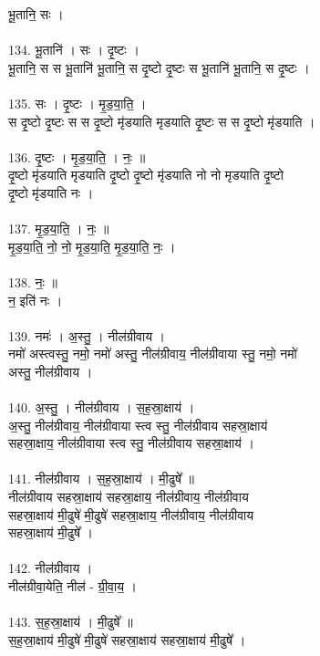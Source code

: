 भू॒तानि॒ सः ।\\
\\
134. भू॒तानि॑ । सः । दृ॒ष्टः ।\\
भू॒तानि॒ स स भू॒तानि॑ भू॒तानि॒ स दृ॒ष्टो दृ॒ष्टः स भू॒तानि॑ भू॒तानि॒ स दृ॒ष्टः ।\\
\\
135. सः । दृ॒ष्टः । मृ॒ड॒या॒ति॒ ।\\
स दृ॒ष्टो दृ॒ष्टः स स दृ॒ष्टो मृ॑डयाति मृडयाति दृ॒ष्टः स स दृ॒ष्टो मृ॑डयाति ।\\
\\
136. दृ॒ष्टः । मृ॒ड॒या॒ति॒ । नः॒ ॥\\
दृ॒ष्टो मृ॑डयाति मृडयाति दृ॒ष्टो दृ॒ष्टो मृ॑डयाति नो नो मृडयाति दृ॒ष्टो\\
दृ॒ष्टो मृ॑डयाति नः ।\\
\\
137. मृ॒ड॒या॒ति॒ । नः॒ ॥\\
मृ॒ड॒या॒ति॒ नो॒ नो॒ मृ॒ड॒या॒ति॒ मृ॒ड॒या॒ति॒ नः॒ ।\\
\\
138. नः॒ ॥\\
न॒ इति॑ नः ।\\
\\
139. नमः॑ । अ॒स्तु॒ । नील॑ग्रीवाय ।\\
नमो॑ अस्त्वस्तु॒ नमो॒ नमो॑ अस्तु॒ नील॑ग्रीवाय॒ नील॑ग्रीवाया स्तु॒ नमो॒ नमो॑\\
अस्तु॒ नील॑ग्रीवाय ।\\
\\
140. अ॒स्तु॒ । नील॑ग्रीवाय । स॒ह॒स्रा॒क्षाय॑ ।\\
अ॒स्तु॒ नील॑ग्रीवाय॒ नील॑ग्रीवाया स्त्व स्तु॒ नील॑ग्रीवाय सहस्रा॒क्षाय॑\\
सहस्रा॒क्षाय॒ नील॑ग्रीवाया स्त्व स्तु॒ नील॑ग्रीवाय सहस्रा॒क्षाय॑ ।\\
\\
141. नील॑ग्रीवाय । स॒ह॒स्रा॒क्षाय॑ । मी॒ढुषे᳚ ॥\\
नील॑ग्रीवाय सहस्रा॒क्षाय॑ सहस्रा॒क्षाय॒ नील॑ग्रीवाय॒ नील॑ग्रीवाय\\
सहस्रा॒क्षाय॑ मी॒ढुषे॑ मी॒ढुषे॑ सहस्रा॒क्षाय॒ नील॑ग्रीवाय॒ नील॑ग्रीवाय\\
सहस्रा॒क्षाय॑ मी॒ढुषे᳚ ।\\
\\
142. नील॑ग्रीवाय ।\\
नील॑ग्रीवा॒येति॒ नील॑ - ग्री॒वा॒य॒ ।\\
\\
143. स॒ह॒स्रा॒क्षाय॑ । मी॒ढुषे᳚ ॥\\
स॒ह॒स्रा॒क्षाय॑ मी॒ढुषे॑ मी॒ढुषे॑ सहस्रा॒क्षाय॑ सहस्रा॒क्षाय॑ मी॒ढुषे᳚ ।\\
